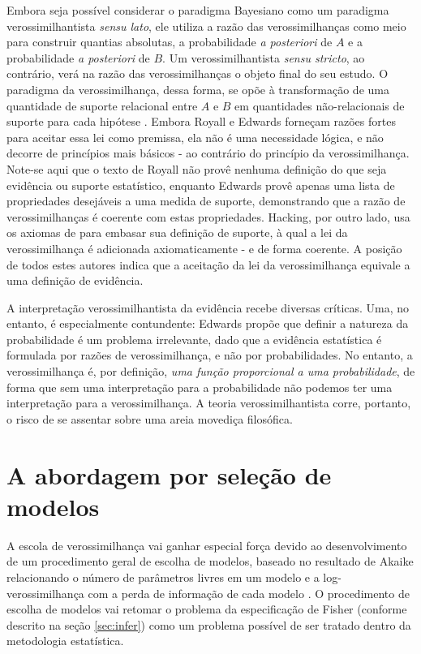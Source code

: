 Embora seja possível considerar o paradigma Bayesiano como um paradigma verossimilhantista {\em sensu lato}, 
ele utiliza a razão das verossimilhanças como meio para construir quantias absolutas, a probabilidade 
{\em a posteriori} de $A$ e a probabilidade {\em a posteriori} de $B$. Um verossimilhantista {\em sensu stricto}, ao contrário,
verá na razão das verossimilhanças
o objeto final do seu estudo. O paradigma da verossimilhança, dessa forma, se opõe à transformação de uma quantidade de 
suporte relacional entre $A$ e $B$ em quantidades não-relacionais de
suporte para cada hipótese \citep{Fitelson07}. 
Embora Royall e Edwards forneçam razões fortes para aceitar essa lei como premissa, ela não é uma necessidade lógica,
e não decorre de princípios mais básicos - ao contrário do princípio da verossimilhança.
Note-se aqui que o texto de Royall não provê nenhuma definição do que seja evidência ou suporte estatístico,
enquanto Edwards provê apenas uma lista de propriedades desejáveis a uma medida de suporte, demonstrando que
a razão de verossimilhanças é coerente com estas propriedades. Hacking, por outro lado, usa os axiomas de 
\citep{Koopman40} para embasar sua definição de suporte, à qual a lei da verossimilhança é adicionada
axiomaticamente - e de forma coerente. A posição de todos estes autores indica que a aceitação da 
lei da verossimilhança equivale a uma definição de evidência. 

A interpretação verossimilhantista da evidência recebe diversas críticas. Uma, no entanto, é especialmente contundente:
Edwards propõe que definir a natureza da probabilidade é um problema irrelevante, dado que a evidência estatística é
formulada por razões de verossimilhança, e não por probabilidades. No entanto, a verossimilhança é, por definição,  
{\em uma função proporcional a uma probabilidade}, de forma que sem uma interpretação para a probabilidade não podemos
ter uma interpretação para a verossimilhança.
A teoria verossimilhantista corre, portanto, o risco de se assentar
sobre uma areia movediça filosófica.

\section{A abordagem por seleção de modelos} 

A escola de verossimilhança vai ganhar especial força devido ao desenvolvimento de um procedimento geral
de escolha de
modelos, baseado no resultado de Akaike relacionando o número de parâmetros livres em um modelo e a
log-verossimilhança com a perda de informação de cada modelo \citep{Akaike74}. O procedimento de escolha de modelos
vai retomar o problema da especificação de Fisher (conforme descrito na seção \ref{sec:infer}) como um problema
possível de ser tratado dentro da metodologia estatística. 


